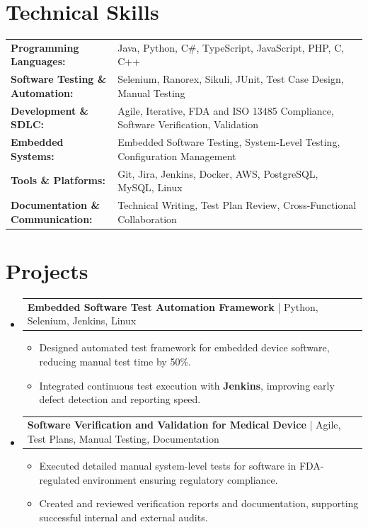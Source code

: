 \documentclass[letterpaper,10pt]{article}
\makeatletter
\newcommand{\resumeItem}[1]{
  \item{\fontsize{8pt}{9pt}\selectfont
    #1 \vspace{-3pt}
  }
}
\newcommand{\resumeProjectHeading}[2]{
    \item
    \begin{tabular*}{1.001\textwidth}{l@{\extracolsep{\fill}}r}
      \fontsize{8.5pt}{10pt}#1 & \textbf{\fontsize{8.5pt}{10pt} #2}\\
    \end{tabular*}\vspace{-7pt}
}
\newcommand{\resumeSubHeadingListStart}{\begin{itemize}[leftmargin=0pt, label={}]}
\newcommand{\resumeSubHeadingListEnd}{\end{itemize}}
\newcommand{\resumeItemListStart}{\begin{itemize}[leftmargin=*]}
\newcommand{\resumeItemListEnd}{\end{itemize}\vspace{-5pt}}
\makeatother
\begin{document}
\section{Technical Skills}
        \vspace{-14pt}
        \begin{table}[h]
            \fontsize{8pt}{9pt}\selectfont
            \begin{tabular}{p{0.3\linewidth} p{0.7\linewidth}}
                \textbf{Programming Languages:} & Java, Python, C\#, TypeScript, JavaScript, PHP, C, C++ \\
                \textbf{Software Testing \& Automation:} & Selenium, Ranorex, Sikuli, JUnit, Test Case Design, Manual Testing \\
                \textbf{Development \& SDLC:} & Agile, Iterative, FDA and ISO 13485 Compliance, Software Verification, Validation \\
                \textbf{Embedded Systems:} & Embedded Software Testing, System-Level Testing, Configuration Management \\
                \textbf{Tools \& Platforms:} & Git, Jira, Jenkins, Docker, AWS, PostgreSQL, MySQL, Linux \\
                \textbf{Documentation \& Communication:} & Technical Writing, Test Plan Review, Cross-Functional Collaboration \\
            \end{tabular}
        \end{table}
 \vspace{-18pt}

\section{Projects}
    \vspace{-5pt}
    \resumeSubHeadingListStart
          \resumeProjectHeading
            {\textbf{Embedded Software Test Automation Framework} | Python, Selenium, Jenkins, Linux}{}
            \resumeItemListStart
                \resumeItem{Designed automated test framework for embedded device software, reducing manual test time by 50\%.}
                \resumeItem{Integrated continuous test execution with \textbf{Jenkins}, improving early defect detection and reporting speed.}
            \resumeItemListEnd
        \vspace{-12pt}
    
        \resumeProjectHeading
            {\textbf{Software Verification and Validation for Medical Device} | Agile, Test Plans, Manual Testing, Documentation}{}
        \resumeItemListStart
                \resumeItem{Executed detailed manual system-level tests for software in FDA-regulated environment ensuring regulatory compliance.}
                \resumeItem{Created and reviewed verification reports and documentation, supporting successful internal and external audits.}
        \resumeItemListEnd
    \resumeSubHeadingListEnd
\end{document}
